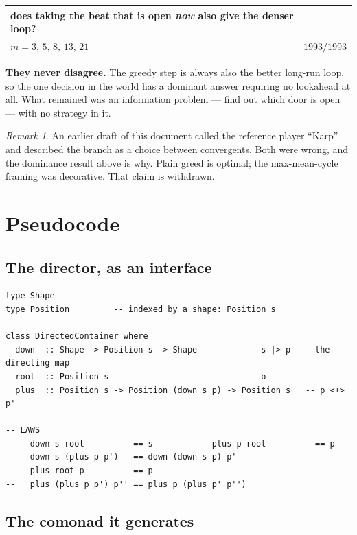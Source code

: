 \documentclass[11pt,a4paper]{article}
\theoremstyle{definition}
\theoremstyle{plain}
\theoremstyle{remark}
\newtheorem*{remark}{Remark}
\begin{document}
\begin{center}
\begin{tabular}{lr}
\toprule
does taking the beat that is open \emph{now} also give the denser loop? & \\
\midrule
$m = 3,\,5,\,8,\,13,\,21$ & $1993/1993$ \\
\bottomrule
\end{tabular}
\end{center}

\textbf{They never disagree.} The greedy step is always also the better
long-run loop, so the one decision in the world has a dominant answer requiring
no lookahead at all. What remained was an information problem --- find out which
door is open --- with no strategy in it.

\begin{remark}
An earlier draft of this document called the reference player ``Karp'' and
described the branch as a choice between convergents. Both were wrong, and the
dominance result above is why. Plain greed is optimal; the max-mean-cycle
framing was decorative. That claim is withdrawn.
\end{remark}

\section{Pseudocode}

\subsection{The director, as an interface}

\begin{lstlisting}
type Shape
type Position         -- indexed by a shape: Position s

class DirectedContainer where
  down  :: Shape -> Position s -> Shape          -- s |> p     the directing map
  root  :: Position s                            -- o
  plus  :: Position s -> Position (down s p) -> Position s   -- p <+> p'

-- LAWS
--   down s root          == s            plus p root          == p
--   down s (plus p p')   == down (down s p) p'
--   plus root p          == p
--   plus (plus p p') p'' == plus p (plus p' p'')
\end{lstlisting}

\subsection{The comonad it generates}
\end{document}
